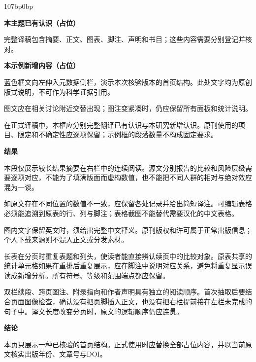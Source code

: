 \documentclass[UTF8,fontset=none,scheme=plain]{ctexart}
\newcommand{\BMJLabel}[1]{\par\smallskip\noindent\textcolor{BMJBlue}{\sffamily\bfseries #1}\par\nobreak\noindent}
\begin{document}
\begin{adjustwidth}{107bp}{0bp}
\begin{minipage}[t]{203bp}
{{\begin{minipage}{\dimexpr310bp-2\fboxsep-2\fboxrule\relax}
\textbf{本主题已有认识（占位）}\par 完整译稿包含摘要、正文、图表、脚注、声明和书目；这些内容需要分别登记并核对。\par\smallskip
\textbf{本示例新增内容（占位）}\par 蓝色框文向左伸入元数据侧栏，演示本次核验版本的首页结构。此处文字均为原创版式说明，不可作为科学证据引用。\par
图文应在相关讨论附近交替出现；图注变紧凑时，仍应保留所有面板和统计说明。\par\smallskip
在正式译稿中，本框应分别完整翻译已有认识与本研究新增认识。原刊使用的项目、限定和不确定性应逐项保留；示例框的段落数量不构成固定要求。
\end{minipage}}}
\end{minipage}\hfill\begin{minipage}[t]{203bp}\sffamily\fontsize{8.1bp}{10.5bp}\selectfont\setlength{\parindent}{0pt}
\BMJLabel{结果}\SampleAbstract\par\smallskip
本段仅展示较长结果摘要在右栏中的连续阅读。源文分别报告的比较和风险层级需要逐项对应，不能为了填满版面而虚构数值，也不能把不同人群的相对与绝对效应混为一谈。\par\smallskip
如原文存在不同位置的数值不一致，应保留各处记录并给出简短译注。可编辑表格必须能追溯到原表的行、列与脚注；表格截图不能替代需要汉化的中文表格。\par\smallskip
图内文字保留英文时，须给出完整中文释义。原刊版权和许可属于正常出版信息；个人下载来源则不混入正文或分发素材。\par\smallskip
长表在分页时重复表题和列头，使读者能直接辨认续页中的比较对象。原表共享的统计单元格如果在重排后重复展示，应在脚注中说明对应关系，避免将重复显示误读成新增分析。所有符号、等级和范围端点都应保留。\par\smallskip
双栏续段、跨页图注、附录指向和作者声明具有独立的阅读顺序。首次抽取后要结合页面图像检查，确认没有把页脚插入正文，也没有把右栏提前接在左栏未完成的句子中。译文长度改变分页时，原文的逻辑顺序仍应连贯。
\BMJLabel{结论}本页只展示一种已核验的首页结构。正式使用时应替换全部占位内容，并以当前原文核实出版年份、文章号与DOI。
\end{minipage}
\end{adjustwidth}
\clearpage
\end{document}

